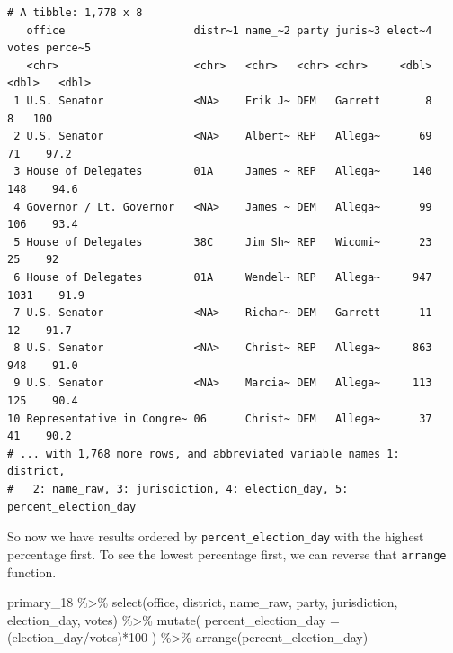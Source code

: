\documentclass[
  letterpaper,
  DIV=11,
  numbers=noendperiod]{scrreprt}
\newenvironment{Shaded}{\begin{snugshade}}{\end{snugshade}}
\newcommand{\AttributeTok}[1]{\textcolor[rgb]{0.40,0.45,0.13}{#1}}
\newcommand{\DecValTok}[1]{\textcolor[rgb]{0.68,0.00,0.00}{#1}}
\newcommand{\FunctionTok}[1]{\textcolor[rgb]{0.28,0.35,0.67}{#1}}
\newcommand{\NormalTok}[1]{\textcolor[rgb]{0.00,0.23,0.31}{#1}}
\newcommand{\SpecialCharTok}[1]{\textcolor[rgb]{0.37,0.37,0.37}{#1}}
\begin{document}
\begin{verbatim}
# A tibble: 1,778 x 8
   office                    distr~1 name_~2 party juris~3 elect~4 votes perce~5
   <chr>                     <chr>   <chr>   <chr> <chr>     <dbl> <dbl>   <dbl>
 1 U.S. Senator              <NA>    Erik J~ DEM   Garrett       8     8   100  
 2 U.S. Senator              <NA>    Albert~ REP   Allega~      69    71    97.2
 3 House of Delegates        01A     James ~ REP   Allega~     140   148    94.6
 4 Governor / Lt. Governor   <NA>    James ~ DEM   Allega~      99   106    93.4
 5 House of Delegates        38C     Jim Sh~ REP   Wicomi~      23    25    92  
 6 House of Delegates        01A     Wendel~ REP   Allega~     947  1031    91.9
 7 U.S. Senator              <NA>    Richar~ DEM   Garrett      11    12    91.7
 8 U.S. Senator              <NA>    Christ~ REP   Allega~     863   948    91.0
 9 U.S. Senator              <NA>    Marcia~ DEM   Allega~     113   125    90.4
10 Representative in Congre~ 06      Christ~ DEM   Allega~      37    41    90.2
# ... with 1,768 more rows, and abbreviated variable names 1: district,
#   2: name_raw, 3: jurisdiction, 4: election_day, 5: percent_election_day
\end{verbatim}

So now we have results ordered by \texttt{percent\_election\_day} with
the highest percentage first. To see the lowest percentage first, we can
reverse that \texttt{arrange} function.

\begin{Shaded}
\begin{Highlighting}[]
\NormalTok{primary\_18 }\SpecialCharTok{\%\textgreater{}\%}
  \FunctionTok{select}\NormalTok{(office, district, name\_raw, party, jurisdiction, election\_day, votes) }\SpecialCharTok{\%\textgreater{}\%}
  \FunctionTok{mutate}\NormalTok{(}
  \AttributeTok{percent\_election\_day =}\NormalTok{ (election\_day}\SpecialCharTok{/}\NormalTok{votes)}\SpecialCharTok{*}\DecValTok{100}
\NormalTok{)  }\SpecialCharTok{\%\textgreater{}\%} \FunctionTok{arrange}\NormalTok{(percent\_election\_day)}
\end{Highlighting}
\end{Shaded}
\end{document}
